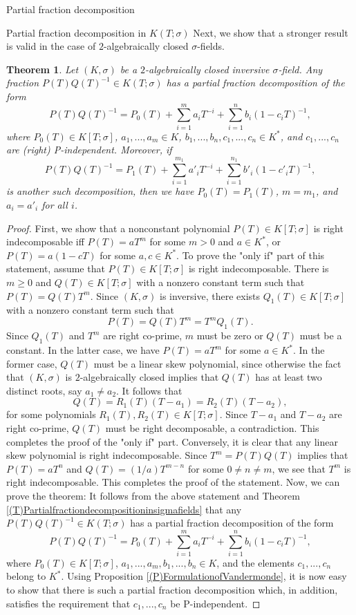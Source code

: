 \documentclass[11pt,a4paper]{article}
\theoremstyle{theorem}
\newtheorem{theorem}{Theorem}[section]
\numberwithin{equation}{section}
\newcommand{\s}{\sigma}
\begin{document}
\begin{section}{Partial fraction decomposition}
\begin{subsection}{Partial fraction decomposition in $K(T;\sigma)$}
		Next, we show that a stronger result is valid in the case of $2$-algebraically closed $\s$-fields.

		\begin{theorem}\label{(T)Partialfractiondecompositioninalgebraicallyclosed}
			Let $(K,\s)$ be a $2$-algebraically closed inversive $\s$-field. Any fraction $P(T)Q(T)^{-1}\in K(T;\s)$  has a partial fraction decomposition of the form
			$$P(T)Q(T)^{-1}=P_0(T)+\sum_{i=1}^m a_iT^{-i}+\sum_{i=1}^n b_i(1-c_iT)^{-1},$$
			where $P_0(T)\in K[T;\sigma]$, $a_1,...,a_m\in K$, $b_1,...,b_n,c_1,...,c_n\in K^*$,  and  $c_1,...,c_n$ are (right) P-independent.  Moreover,  if 
			$$P(T)Q(T)^{-1}=P_1(T)+\sum_{i=1}^{m_1} a'_iT^{-i}+\sum_{i=1}^{n_1} b'_i(1-c'_iT)^{-1},$$
			is another such decomposition, then we have
			$P_0(T)=P_1(T)$, $m=m_1$, and  $a_i=a'_i$ for all $i$. 
		\end{theorem}
		\begin{proof}	
			First, we show that a nonconstant polynomial $P(T)\in K[T;\sigma]$ is right indecomposable iff $P(T)=aT^m$ for some $m>0$ and $a\in K^*$, or $P(T)=a(1-cT)$ for some $a,c\in K^*$. To prove the "only if" part of this statement, assume that $P(T)\in K[T;\sigma]$ is right indecomposable. There is $m\geq 0$ and $Q(T)\in K[T;\sigma]$ with a nonzero constant term such that $P(T)=Q(T)T^m$. Since $(K,\s)$ is inversive, there exists $Q_1(T)\in K[T;\sigma]$ with a nonzero constant term such that $$P(T)=Q(T)T^m=T^mQ_1(T).$$
			Since $Q_1(T)$ and $T^m$ are right co-prime, $m$ must be zero or $Q(T)$ must be a constant. In the latter case, we have $P(T)=aT^m$ for some $a\in K^*$. In the former case, $Q(T)$ must be a linear skew polynomial, since otherwise the fact that $(K,\s)$ is $2$-algebraically closed implies that $Q(T)$ has at least two distinct roots, say $a_1\neq a_2$. It follows that 
			$$Q(T)=R_1(T)(T-a_1)=R_2(T)(T-a_2),$$    
			for some polynomials $R_1(T),R_2(T)\in K[T;\sigma]$. Since $T-a_1$ and $T-a_2$ are right co-prime, $Q(T)$ must be right decomposable, a contradiction. This completes the proof of the "only if" part.  Conversely, it is clear that any linear skew polynomial is right indecomposable. Since $T^m=P(T)Q(T)$ implies that $P(T)=aT^n$ and  $Q(T)=(1/a)T^{m-n}$ for some $0\neq n\neq m$, we see that $T^m$ is right indecomposable. This completes the proof of the statement. Now, we can prove the theorem: It follows from the above statement and  Theorem \ref{(T)Partialfractiondecompositioninsigmafields} that any $P(T)Q(T)^{-1}\in K(T;\s)$  has a partial fraction decomposition of the form
			$$P(T)Q(T)^{-1}=P_0(T)+\sum_{i=1}^m a_iT^{-i}+\sum_{i=1}^n b_i(1-c_iT)^{-1},$$
			where $P_0(T)\in K[T;\sigma]$, $a_1,...,a_m,b_1,...,b_n\in K$, and the elements $c_1,...,c_n$ belong to $K^*$. Using Proposition \ref{(P)FormulationofVandermonde}, it is now easy to show that there is such a partial fraction decomposition which, in addition, satisfies the requirement that $c_1,...,c_n$ be P-independent. 
			

\end{proof}
\end{subsection}
\end{section}
\end{document}
